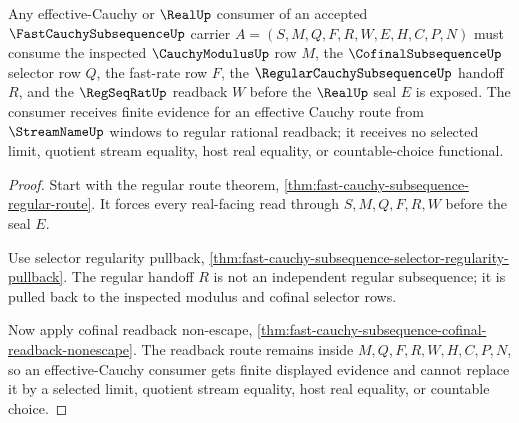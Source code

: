 \begin{theorem}
\label{thm:fast-cauchy-subsequence-effective-cauchy-consumer}
Any effective-Cauchy or $\RealUp$ consumer of an accepted $\FastCauchySubsequenceUp$ carrier $A=(S,M,Q,F,R,W,E,H,C,P,N)$ must consume the inspected $\CauchyModulusUp$ row $M$, the $\CofinalSubsequenceUp$ selector row $Q$, the fast-rate row $F$, the $\RegularCauchySubsequenceUp$ handoff $R$, and the $\RegSeqRatUp$ readback $W$ before the $\RealUp$ seal $E$ is exposed. The consumer receives finite evidence for an effective Cauchy route from $\StreamNameUp$ windows to regular rational readback; it receives no selected limit, quotient stream equality, host real equality, or countable-choice functional.
\end{theorem}
\begin{proof}
Start with the regular route theorem, \autoref{thm:fast-cauchy-subsequence-regular-route}. It forces every real-facing read through $S,M,Q,F,R,W$ before the seal $E$.

Use selector regularity pullback, \autoref{thm:fast-cauchy-subsequence-selector-regularity-pullback}. The regular handoff $R$ is not an independent regular subsequence; it is pulled back to the inspected modulus and cofinal selector rows.

Now apply cofinal readback non-escape, \autoref{thm:fast-cauchy-subsequence-cofinal-readback-nonescape}. The readback route remains inside $M,Q,F,R,W,H,C,P,N$, so an effective-Cauchy consumer gets finite displayed evidence and cannot replace it by a selected limit, quotient stream equality, host real equality, or countable choice.
\end{proof}

